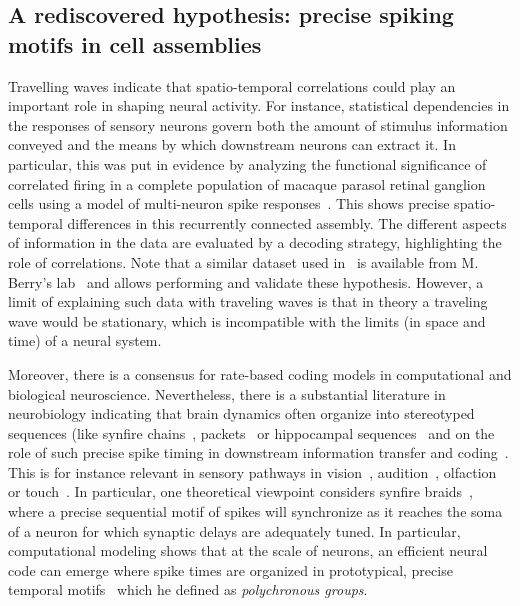 \documentclass[brainsci, %
               review,submit,pdftex,moreauthors%
               ]{Definitions/mdpi}
\begin{document}
\subsection{A rediscovered  hypothesis: precise spiking motifs in cell assemblies}
Travelling waves indicate that spatio-temporal correlations could play an important role in shaping neural activity. For instance, statistical dependencies in the responses of sensory neurons govern both the amount of stimulus information conveyed and the means by which downstream neurons can extract it. In particular, this was put in evidence by analyzing the functional significance of correlated firing in a complete population of macaque parasol retinal ganglion cells using a model of multi-neuron spike responses~\citep{pillow_spatio-temporal_2008}. This shows precise spatio-temporal differences in this recurrently connected assembly. The different aspects of information in the data are evaluated by a decoding strategy, highlighting the role of correlations. Note that a similar dataset used in~\citep{schneidman_weak_2006} is available from M. Berry's lab~\citep{berry_spike_2022} and allows performing and validate these hypothesis. However, a limit of explaining such data with traveling waves is that in theory a traveling wave would be stationary, which is incompatible with the limits (in space and time) of a neural system. 

Moreover, there is a consensus for rate-based coding models in computational and biological neuroscience. Nevertheless, there is a substantial literature in neurobiology indicating that brain dynamics often organize into stereotyped sequences (like synfire chains~\citep{ikegaya_synfire_2004}, packets~\citep{luczak_sequential_2007} or hippocampal sequences~\citep{pastalkova_internally_2008,villette_internally_2015} and on the role of such precise spike timing in downstream information transfer and coding~\citep{villette_internally_2015,branco_dendritic_2010,luczak_packet-based_2015}. This is for instance relevant in sensory pathways in vision~\citep{meister_concerted_1995}, audition~\citep{decharms_primary_1996}, olfaction~\citep{wehr_odour_1996} or touch~\citep{johansson_first_2004}. In particular, one theoretical viewpoint considers synfire braids~\citep{bienenstock_model_1995}, where a precise sequential motif of spikes will synchronize as it reaches the soma of a neuron for which synaptic delays are adequately tuned. In particular, computational modeling shows that at the scale of neurons, an efficient neural code can emerge where spike times are organized in prototypical, precise temporal motifs~\citep{izhikevich_polychronization_2006} which he defined as \emph{polychronous groups}.
\end{document}
